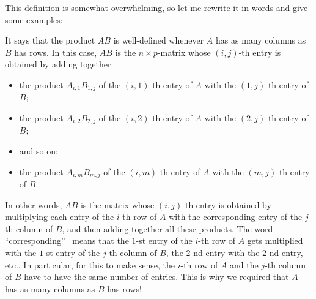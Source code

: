 \documentclass[numbers=enddot,12pt,final,onecolumn,notitlepage]{scrartcl}%
\theoremstyle{definition}
\begin{document}
This definition is somewhat overwhelming, so let me rewrite it in words and
give some examples:

It says that the product $AB$ is well-defined whenever $A$ has as many columns
as $B$ has rows. In this case, $AB$ is the $n\times p$-matrix whose $\left(
i,j\right)  $-th entry is obtained by adding together:

\begin{itemize}
\item the product $A_{i,1}B_{1,j}$ of the $\left(  i,1\right)  $-th entry of
$A$ with the $\left(  1,j\right)  $-th entry of $B$;

\item the product $A_{i,2}B_{2,j}$ of the $\left(  i,2\right)  $-th entry of
$A$ with the $\left(  2,j\right)  $-th entry of $B$;

\item and so on;

\item the product $A_{i,m}B_{m,j}$ of the $\left(  i,m\right)  $-th entry of
$A$ with the $\left(  m,j\right)  $-th entry of $B$.
\end{itemize}

In other words, $AB$ is the matrix whose $\left(  i,j\right)  $-th entry is
obtained by multiplying each entry of the $i$-th row of $A$ with the
corresponding entry of the $j$-th column of $B$, and then adding together all
these products. The word \textquotedblleft corresponding\textquotedblright%
\ means that the $1$-st entry of the $i$-th row of $A$ gets multiplied with
the $1$-st entry of the $j$-th column of $B$, the $2$-nd entry with the $2$-nd
entry, etc.. In particular, for this to make sense, the $i$-th row of $A$ and
the $j$-th column of $B$ have to have the same number of entries. This is why
we required that $A$ has as many columns as $B$ has rows!
\end{document}
